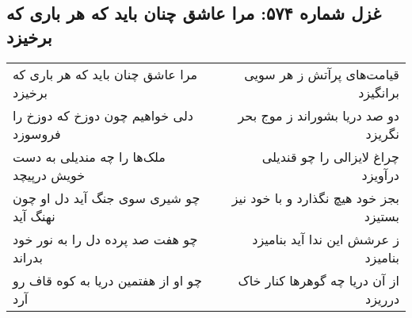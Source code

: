 \begin{center}
\section*{غزل شماره ۵۷۴: مرا عاشق چنان باید که هر باری که برخیزد}
\label{sec:0574}
\begin{longtable}{l p{0.5cm} r}
مرا عاشق چنان باید که هر باری که برخیزد
&&
قیامت‌های پرآتش ز هر سویی برانگیزد
\\
دلی خواهیم چون دوزخ که دوزخ را فروسوزد
&&
دو صد دریا بشوراند ز موج بحر نگریزد
\\
ملک‌ها را چه مندیلی به دست خویش درپیچد
&&
چراغ لایزالی را چو قندیلی درآویزد
\\
چو شیری سوی جنگ آید دل او چون نهنگ آید
&&
بجز خود هیچ نگذارد و با خود نیز بستیزد
\\
چو هفت صد پرده دل را به نور خود بدراند
&&
ز عرشش این ندا آید بنامیزد بنامیزد
\\
چو او از هفتمین دریا به کوه قاف رو آرد
&&
از آن دریا چه گوهرها کنار خاک درریزد
\\
\end{longtable}
\end{center}
